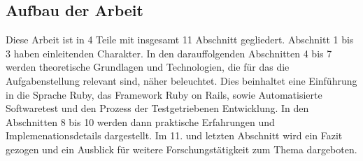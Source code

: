 \subsection{Aufbau der Arbeit}

Diese Arbeit ist in 4 Teile mit insgesamt 11 Abschnitt gegliedert. Abschnitt 1 bis 3 haben einleitenden Charakter. In den darauffolgenden Abschnitten 4 bis 7 werden theoretische Grundlagen und Technologien, die für das die Aufgabenstellung relevant sind, näher beleuchtet. Dies beinhaltet eine Einführung in die Sprache Ruby, das Framework Ruby on Rails, sowie Automatisierte Softwaretest und den Prozess der Testgetriebenen Entwicklung.
In den Abschnitten 8 bis 10 werden dann praktische Erfahrungen und Implemenationsdetails dargestellt. Im 11. und letzten Abschnitt wird ein Fazit gezogen und ein Ausblick für weitere Forschungstätigkeit zum Thema dargeboten.


